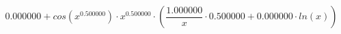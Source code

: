 \documentclass{article}
\begin{document}
$$0.000000 + cos(x^{0.500000}) \cdot x^{0.500000} \cdot (\frac{1.000000}{x} \cdot 0.500000 + 0.000000 \cdot ln(x))$$
\end{document}
